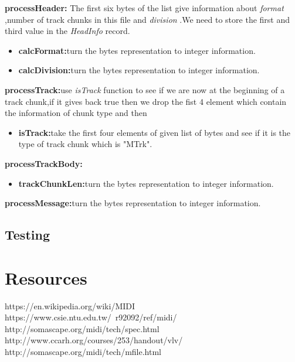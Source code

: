 \documentclass[12.5pt]{scrartcl}
\begin{document}
\textbf{processHeader:}
The first six bytes of the list give information about\textit{ format },number of track chunks in this file and\textit{ division }.We need to store the first and third value in the\textit{ HeadInfo }record.
\begin{itemize}
	\item \textbf{calcFormat:}turn the bytes representation to integer information.
	\item \textbf{calcDivision:}turn the bytes representation to integer information.
\end{itemize}

\textbf{processTrack:}use\textit{ isTrack }function to see if we are now at the beginning of a track chunk,if it gives back true then we drop the fist 4 element which contain the information of chunk type and then

\begin{itemize}
	\item \textbf{isTrack:}take the first four elements of given list of bytes and see if it is the type of track chunk which is "MTrk".
\end{itemize}

\textbf{processTrackBody:}
\begin{itemize}
	\item \textbf{trackChunkLen:}turn the bytes representation to integer information.
\end{itemize}

\textbf{processMessage:}turn the bytes representation to integer information.
\subsection{Testing}

\section{Resources}
https://en.wikipedia.org/wiki/MIDI  \\
https://www.csie.ntu.edu.tw/~r92092/ref/midi/   \\
http://somascape.org/midi/tech/spec.html    \\
http://www.ccarh.org/courses/253/handout/vlv/   \\
http://somascape.org/midi/tech/mfile.html   \\
\end{document}
